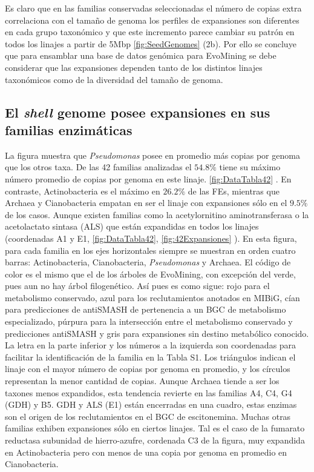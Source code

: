 \documentclass[12pt,twoside]{reedthesis}
\begin{document}
  Es claro que en las familias conservadas seleccionadas el número de
  copias extra correlaciona con el tamaño de genoma los perfiles de
  expansiones son diferentes en cada grupo taxonómico y que este
  incremento parece cambiar su patrón en todos los linajes a partir de
  5Mbp \autoref{fig:SeedGenomes} (2b). Por ello se concluye que para
  ensamblar una base de datos genómica para EvoMining se debe considerar
  que las expansiones dependen tanto de los distintos linajes taxonómicos
  como de la diversidad del tamaño de genoma.
  
  \subsection{\texorpdfstring{El \emph{shell} genome posee expansiones en
  sus familias
  enzimáticas}{El shell genome posee expansiones en sus familias enzimáticas}}\label{el-shell-genome-posee-expansiones-en-sus-familias-enzimaticas}
  
  La figura muestra que \emph{Pseudomonas} posee en promedio más copias
  por genoma que los otros taxa. De las 42 familias analizadas el
  \(54.8\%\) tiene su máximo número promedio de copias por genoma en este
  linaje. \autoref{fig:DataTabla42} . En contraste, Actinobacteria es el
  máximo en \(26.2\%\) de las FEs, mientras que Archaea y Cianobacteria
  empatan en ser el linaje con expansiones sólo en el \(9.5\%\) de los
  casos. Aunque existen familias como la acetylornitino aminotransferasa o
  la acetolactato sintasa (ALS) que están expandidas en todos los linajes
  (coordenadas A1 y E1, \autoref{fig:DataTabla42},
  \autoref{fig:42Expansiones} ). En esta figura, para cada familia en los
  ejes horizontales siempre se muestran en orden cuatro barras:
  Actinobacteria, Cianobacteria, \emph{Pseudomonas} y Archaea. El código
  de color es el mismo que el de los árboles de EvoMining, con excepción
  del verde, pues aun no hay árbol filogenético. Así pues es como sigue:
  rojo para el metabolismo conservado, azul para los reclutamientos
  anotados en MIBiG, cían para predicciones de antiSMASH de pertenencia a
  un BGC de metabolismo especializado, púrpura para la intersección entre
  el metabolismo conservado y predicciones antiSMASH y gris para
  expansiones sin destino metabólico conocido. La letra en la parte
  inferior y los números a la izquierda son coordenadas para facilitar la
  identificación de la familia en la Tabla S1. Los triángulos indican el
  linaje con el mayor número de copias por genoma en promedio, y los
  círculos representan la menor cantidad de copias. Aunque Archaea tiende
  a ser los taxones menos expandidos, esta tendencia revierte en las
  familias A4, C4, G4 (GDH) y B5. GDH y ALS (E1) están encerradas en una
  cuadro, estas enzimas son el origen de los reclutamientos en el BGC de
  escitonemina. Muchas otras familias exhiben expansiones sólo en ciertos
  linajes. Tal es el caso de la fumarato reductasa subunidad de
  hierro-azufre, cordenada C3 de la figura, muy expandida en
  Actinobacteria pero con menos de una copia por genoma en promedio en
  Cianobacteria.
  
\end{document}
